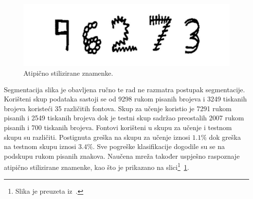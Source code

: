 \begin{figure}[htb]
    \centering
    \includegraphics[width=12cm]{images/chapter2/atypical-data.png}
    \caption{Atipično stilizirane znamenke.}
    \label{fig:atipicno-stilizirane-znamenke}
\end{figure}
Segmentacija slika je obavljena ručno te rad ne razmatra postupak segmentacije. Korišteni skup podataka sastoji se od
9298 rukom pisanih brojeva i 3249 tiskanih brojeva koristeći 35 različitih fontova. Skup za učenje koristio je 7291
rukom pisanih i 2549 tiskanih brojeva dok je testni skup sadržao preostalih 2007 rukom pisanih i 700 tiskanih brojeva.
Fontovi korišteni u skupu za učenje i testnom skupu su različiti. Postignuta greška na skupu za učenje iznosi $1.1\%$
dok greška na testnom skupu iznosi $3.4\%$. Sve pogreške klasifikacije dogodile su se na podskupu rukom pisanih znakova.
Naučena mreža također uspješno raspoznaje atipično stilizirane znamenke, kao što je prikazano na
slici\footnote{Slika je preuzeta iz\ \citep{leCun1990}.}\ \ref{fig:atipicno-stilizirane-znamenke}.

